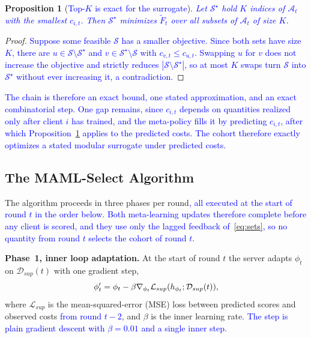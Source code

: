 \documentclass[journal]{IEEEtran}
\newtheorem{proposition}{Proposition}
\theoremstyle{remark}
\newcommand{\revision}[1]{#1}
\newcommand{\revtwo}[1]{\textcolor{blue}{#1}}
\begin{document}
\begin{proposition}[\revtwo{Top-$K$ is exact for the surrogate}]\label{prop:topk}
\revtwo{Let $\mathcal{S}^\star$ hold $K$ indices of $\mathcal{A}_t$ with the smallest $c_{i,t}$. Then $\mathcal{S}^\star$ minimizes $\widetilde{F}_t$ over all subsets of $\mathcal{A}_t$ of size $K$.}
\end{proposition}
\begin{proof}
\revtwo{Suppose some feasible $\mathcal{S}$ has a smaller objective. Since both sets have size $K$, there are $u\in\mathcal{S}\setminus\mathcal{S}^\star$ and $v\in\mathcal{S}^\star\setminus\mathcal{S}$ with $c_{v,t}\le c_{u,t}$. Swapping $u$ for $v$ does not increase the objective and strictly reduces $|\mathcal{S}\setminus\mathcal{S}^\star|$, so at most $K$ swaps turn $\mathcal{S}$ into $\mathcal{S}^\star$ without ever increasing it, a contradiction.}
\end{proof}

\revtwo{The chain is therefore an exact bound, one stated approximation, and an exact combinatorial step. One gap remains, since $c_{i,t}$ depends on quantities realized only after client $i$ has trained, and the meta-policy fills it by predicting $c_{i,t}$, after which Proposition~\ref{prop:topk} applies to the predicted costs. The cohort therefore exactly optimizes a stated modular surrogate under predicted costs.}

\subsection{The MAML-Select Algorithm}\label{sec:method_selection}
The algorithm proceeds in three phases per round\revtwo{, all executed at the start of round $t$ in the order below. Both meta-learning updates therefore complete before any client is scored, and they use only the lagged feedback of~\eqref{eq:sets}, so no quantity from round $t$ selects the cohort of round $t$}.

\textbf{Phase~1, inner loop adaptation.}
\revision{At the start of round $t$ the server adapts $\phi_t$ on $\mathcal{D}_{sup}(t)$ with one gradient step,}
\begin{equation}
	\color{black}
		\phi'_t = \phi_t - \beta \nabla_{\phi_t} \mathcal{L}_{sup}(h_{\phi_t};\mathcal{D}_{sup}(t)),
		\label{eq:inner_loop}
\end{equation}
where $\mathcal{L}_{sup}$ is the mean-squared-error (MSE) loss between predicted scores and observed costs \revtwo{from round $t-2$}, and $\beta$ is the inner learning rate\revtwo{. The step is plain gradient descent with $\beta=0.01$ and a single inner step}.
\end{document}
